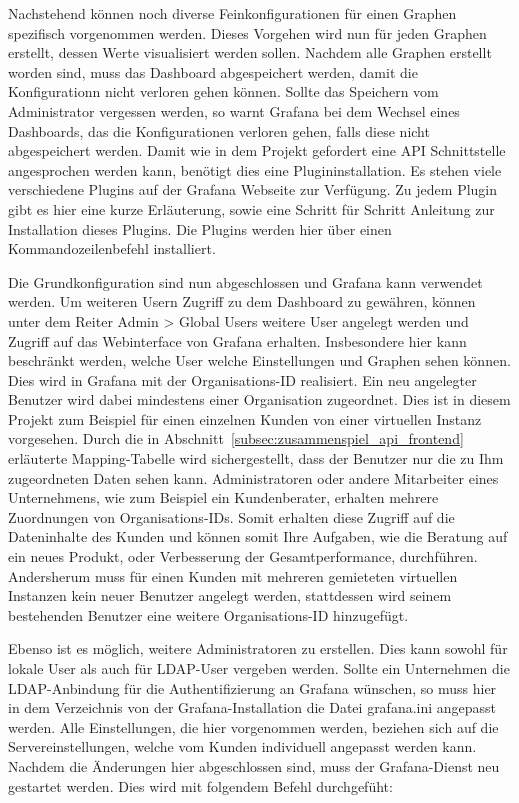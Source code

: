 {Nachstehend können noch diverse Feinkonfigurationen für einen Graphen
spezifisch vorgenommen werden. Dieses Vorgehen wird nun für jeden Graphen
erstellt, dessen Werte visualisiert werden sollen. Nachdem alle Graphen
erstellt worden sind, muss das Dashboard abgespeichert werden, damit die
Konfigurationn nicht verloren gehen können. Sollte das Speichern vom
Administrator vergessen werden, so warnt Grafana bei dem Wechsel eines
Dashboards, das die Konfigurationen verloren gehen, falls diese nicht
abgespeichert werden.  Damit wie in dem Projekt gefordert eine API
Schnittstelle angesprochen werden kann, benötigt dies eine Plugininstallation.
Es stehen viele verschiedene Plugins auf der Grafana Webseite zur Verfügung. Zu
jedem Plugin gibt es hier eine kurze Erläuterung, sowie eine Schritt für
Schritt Anleitung zur Installation dieses Plugins. Die Plugins werden hier über
einen Kommandozeilenbefehl installiert.

Die Grundkonfiguration sind nun abgeschlossen und Grafana kann verwendet
werden. Um weiteren Usern Zugriff zu dem Dashboard zu gewähren, können unter
dem Reiter Admin > Global Users weitere User angelegt werden und
Zugriff auf das Webinterface von Grafana erhalten. Insbesondere hier kann
beschränkt werden, welche User welche Einstellungen und Graphen sehen können.
Dies wird in Grafana mit der Organisations-ID realisiert. Ein neu angelegter
Benutzer wird dabei mindestens einer Organisation zugeordnet. Dies ist in
diesem Projekt zum Beispiel für einen einzelnen Kunden von einer virtuellen
Instanz vorgesehen. Durch die in
Abschnitt~\ref{subsec:zusammenspiel_api_frontend} erläuterte Mapping-Tabelle
wird sichergestellt, dass der Benutzer nur die zu Ihm zugeordneten Daten sehen
kann. Administratoren oder andere Mitarbeiter eines Unternehmens, wie zum
Beispiel ein Kundenberater, erhalten mehrere Zuordnungen von Organisations-IDs.
Somit erhalten diese Zugriff auf die Dateninhalte des Kunden und können somit
Ihre Aufgaben, wie die Beratung auf ein neues Produkt, oder Verbesserung der
Gesamtperformance, durchführen. Andersherum muss für einen Kunden mit mehreren
gemieteten virtuellen Instanzen kein neuer Benutzer angelegt werden,
stattdessen wird seinem bestehenden Benutzer eine weitere Organisations-ID
hinzugefügt.

Ebenso ist es möglich, weitere Administratoren zu erstellen. Dies kann sowohl
für lokale User als auch für LDAP\hyp{}User vergeben werden.  Sollte ein
Unternehmen die LDAP\hyp{}Anbindung für die Authentifizierung an Grafana
wünschen, so muss hier in dem Verzeichnis von der Grafana\hyp{}Installation die
Datei grafana.ini angepasst werden. Alle Einstellungen, die hier vorgenommen
werden, beziehen sich auf die Servereinstellungen, welche vom Kunden
individuell angepasst werden kann.  Nachdem die Änderungen hier abgeschlossen
sind, muss der Grafana\hyp{}Dienst neu gestartet werden. Dies wird mit
folgendem Befehl durchgefüht:

}
